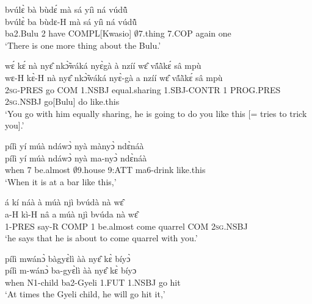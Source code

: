 \begin{exe} 
\exC\label{121}
  \glll bvúlɛ̀ bà bùdɛ́ mà sá yíì ná vúdũ̂ \\
         bvúlɛ̀ ba bùdɛ-H mà sá yíì ná vúdũ̂ \\
         ba2.Bulu 2 have COMPL[Kwasio] $\emptyset$7.thing 7.COP again one   \\
    \trans `There is one more thing about the Bulu.'
\end{exe}

\begin{exe} 
\exC\label{122} 
  \glll wɛ́ kɛ́ nà nyɛ̂ nkɔ̃̀wáká nyɛ̀gà à nzíí wɛ̂ vã́ã̀kɛ́ sâ mpù \\
         wɛ-H kɛ̀-H nà nyɛ̂ nkɔ̃̀wáká nyɛ̀-gà a nzíí wɛ̂ vã́ã̀kɛ́ sâ mpù \\
         2\textsc{sg}-PRES go COM 1.NSBJ equal.sharing 1.SBJ-CONTR 1 PROG.PRES 2\textsc{sg}.NSBJ go[Bulu] do like.this  \\
    \trans `You go with him equally sharing, he is going to do you like this [= tries to trick you].'
\end{exe}

\begin{exe} 
\exC\label{123}
  \glll  pílì yí múà ndáwɔ̀ nyà mànyɔ̀ ndɛ̀náà \\
      pílì yí múà ndáwɔ̀ nyà ma-nyɔ̀ ndɛ̀náà \\
         when 7 be.almost $\emptyset$9.house 9:ATT ma6-drink like.this   \\
    \trans `When it is at a bar like this,'
\end{exe}

\begin{exe} 
\exC\label{124}
  \glll  á kí náà à múà njì bvúdà nà wɛ̂ \\
       a-H kì-H nâ a múà njì bvúda nà wɛ̂ \\
         1-PRES say-R COMP 1 be.almost come quarrel COM 2\textsc{sg}.NSBJ   \\
    \trans `he says that he is about to come quarrel with you.'
\end{exe}

\begin{exe} 
\exC\label{125} 
  \glll  pílì mwánɔ̀ bàgyɛ̀lì àà nyɛ̂ kɛ̀ bíyɔ̀ \\
       pílì m-wánɔ̀ ba-gyɛ̀lì àà nyɛ̂ kɛ̀ bíyɔ\\
          when N1-child ba2-Gyeli 1.FUT 1.NSBJ go hit  \\
    \trans `At times the Gyeli child, he will go hit it,'
\end{exe}

